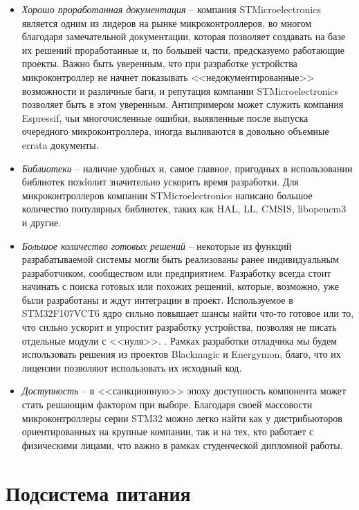 \begin{itemize}
    \item \textit{Хорошо проработанная документация} -- компания
     STMicroelectronics является одним из лидеров на рынке микроконтроллеров, во многом благодаря
     замечательной документации, которая позволяет создавать на базе их решений проработанные
     и, по большей части, предсказуемо работающие проекты. Важно быть уверенным, что при разработке
     устройства микроконтроллер не начнет показывать <<недокументированные>> возможности и
     различные баги, и репутация компании STMicroelectronics позволяет быть в этом
     уверенным. Антипримером может служить компания Espressif, чьи многочисленные ошибки,
     выявленные после выпуска очередного микроконтроллера, иногда выливаются в довольно
     объемные errata документы.
    \item \textit{Библиотеки} -- наличие удобных и, самое главное, пригодных в использовании 
     библиотек позdолит значительно ускорить время разработки. Для микроконтроллеров
     компании STMicroelectronics написано большое количество популярных библиотек, таких
     как HAL, LL, CMSIS, libopencm3 и другие.
    \item \textit{Большое количество готовых решений} -- некоторые из функций разрабатываемой
     системы могли быть реализованы ранее индивидуальным разработчиком, 
     сообществом или предприятием. Разработку всегда стоит начинать с поиска готовых или похожих 
     решений, которые, возможно, уже были разработаны и ждут интеграции в проект. Используемое
     в STM32F107VCT6 ядро сильно повышает шансы найти что-то готовое или то, что сильно 
     ускорит и упростит разработку устройства, позволяя не писать отдельные модули с <<нуля>>.
     \cite{Lakamera:embed}. Рамках разработки отладчика мы будем использовать решения из проектов 
     Blackmagic и Energymon, благо, что их лицензии позволяют использовать их исходный код.
    \item \textit{Доступность} -- в <<санкционную>> эпоху доступность компонента может стать 
     решающим фактором при выборе. Благодаря своей массовости микроконтроллеры серии STM32 
     можно легко найти как у дистрибьюторов ориентированных на крупные компании, так и на тех,
     кто работает с физическими лицами, что важно в рамках студенческой дипломной работы.
\end{itemize}

\section{Подсистема питания}
\hspace{1cm} 

